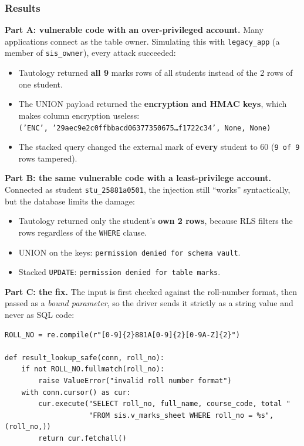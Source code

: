 \documentclass[11pt,a4paper]{report}
\begin{document}
\subsubsection{Results}
\textbf{Part A: vulnerable code with an over-privileged account.} Many applications connect as the table owner. Simulating this with \texttt{legacy\_app} (a member of \texttt{sis\_owner}), every attack succeeded:
\begin{itemize}
    \item Tautology returned \textbf{all 9} marks rows of all students instead of the 2 rows of one student.
    \item The UNION payload returned the \textbf{encryption and HMAC keys}, which makes column encryption useless:\\
    {\scriptsize\texttt{('ENC', '29aec9e2c0ffbbacd06377350675\dots f1722c34', None, None)}}
    \item The stacked query changed the external mark of \textbf{every} student to 60 (\texttt{9 of 9} rows tampered).
\end{itemize}

\textbf{Part B: the same vulnerable code with a least-privilege account.} Connected as student \texttt{stu\_25881a0501}, the injection still ``works'' syntactically, but the database limits the damage:
\begin{itemize}
    \item Tautology returned only the student's \textbf{own 2 rows}, because RLS filters the rows regardless of the \texttt{WHERE} clause.
    \item UNION on the keys: \texttt{permission denied for schema vault}.
    \item Stacked \texttt{UPDATE}: \texttt{permission denied for table marks}.
\end{itemize}

\textbf{Part C: the fix.} The input is first checked against the roll-number format, then passed as a \emph{bound parameter}, so the driver sends it strictly as a string value and never as SQL code:

\begin{lstlisting}[style=py, caption={Fixed lookup with validation and a parameterized query}]
ROLL_NO = re.compile(r"[0-9]{2}881A[0-9]{2}[0-9A-Z]{2}")

def result_lookup_safe(conn, roll_no):
    if not ROLL_NO.fullmatch(roll_no):
        raise ValueError("invalid roll number format")
    with conn.cursor() as cur:
        cur.execute("SELECT roll_no, full_name, course_code, total "
                    "FROM sis.v_marks_sheet WHERE roll_no = %s", (roll_no,))
        return cur.fetchall()
\end{lstlisting}
\end{document}
